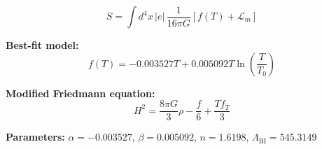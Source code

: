 
\begin{equation}
  S = \int d^4x \, |e| \, \frac{1}{16\pi G} \left[ f(T) + \mathcal{L}_m \right]
\end{equation}

\textbf{Best-fit model:}
\begin{equation}
  f(T) = -0.003527 T + 0.005092 T \ln\!\left(\frac{T}{T_0}\right)
\end{equation}

\textbf{Modified Friedmann equation:}
\begin{equation}
  H^2 = \frac{8\pi G}{3} \rho - \frac{f}{6} + \frac{T f_T}{3}
\end{equation}

\textbf{Parameters:}
$\alpha = -0.003527$, \quad
$\beta = 0.005092$, \quad
$n = 1.6198$, \quad
$\Lambda_{\text{BI}} = 545.3149$